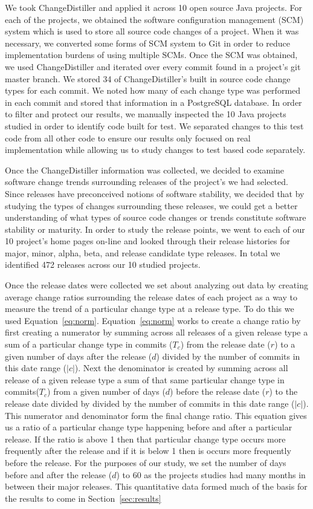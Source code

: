 \documentclass[conference]{IEEEtran}
\begin{document}
We took ChangeDistiller and applied it across 10 open source Java projects. For each of the projects, we obtained the software configuration management (SCM) system
which is used to store all source code changes of a project. When it was necessary, we converted some forms of SCM system to Git in order to reduce implementation
burdens of using multiple SCMs. Once the SCM was obtained, we used ChangeDistiller and iterated over every commit found in a project's git master branch. We stored
34 of ChangeDistiller's built in source code change types for each commit. We noted how many of each change type was performed in each commit and stored that information
in a PostgreSQL database. In order to filter and protect our results, we manually inspected the 10 Java projects studied in order to identify code built for test.
We separated changes to this test code from all other code to ensure our results only focused on real implementation while allowing us to study changes to
test based code separately.

Once the ChangeDistiller information was collected, we decided to examine software change trends surrounding releases of the project's we had selected. Since releases
have preconceived notions of software stability, we decided that by studying the types of changes surrounding these releases, we could get a better understanding of
what types of source code changes or trends constitute software stability or maturity. In order to study the release points, we went to each of our 10 project's 
home pages on-line and looked through their release histories for major, minor, alpha, beta, and release candidate type releases. In total we identified 472 releases
across our 10 studied projects.  

Once the release dates were collected we set about analyzing out data by creating average change ratios surrounding the release dates of each 
project as a way to measure the trend of a particular change type at a release type. 
To do this we used Equation~\ref{eq:norm}. Equation~\ref{eq:norm} works to create a change ratio by first creating a numerator by summing across all releases of
a given release type a sum of a particular change type in commits ($T_c$)
from the release date ($r$) to a given number of days after the release ($d$) divided by the number of commits in this date range ($|c|$). Next the denominator
is created by summing across all release of a given release type
a sum of that same particular change type in commits($T_c$) from a given number of days ($d$) before the release date ($r$) to
the release date divided by divided by the number of commits in this date range ($|c|$). This numerator and denominator form the final change ratio.
This equation gives us a ratio of a particular change type happening before and after a particular release. If the ratio is above 1 then that particular change
type occurs more frequently after the release and if it is below 1 then is occurs more frequently before the release. For the purposes of our study, we set the
number of days before and after the release ($d$) to 60 as the projects studies had many months in between their major releases. This quantitative data
formed much of the basis for the results to come in Section~\ref{sec:results}
\end{document}
